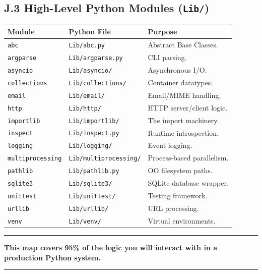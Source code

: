 \hypertarget{j.3-high-level-python-modules-lib}{%
\subsection{\texorpdfstring{J.3 High-Level Python Modules
(\texttt{Lib/})}{J.3 High-Level Python Modules (Lib/)}}\label{j.3-high-level-python-modules-lib}}

\begin{longtable}[]{@{}lll@{}}
\toprule
Module & Python File & Purpose \\
\midrule
\endhead
\passthrough{\lstinline!abc!} & \passthrough{\lstinline!Lib/abc.py!} &
Abstract Base Classes. \\
\passthrough{\lstinline!argparse!} &
\passthrough{\lstinline!Lib/argparse.py!} & CLI parsing. \\
\passthrough{\lstinline!asyncio!} &
\passthrough{\lstinline!Lib/asyncio/!} & Asynchronous I/O. \\
\passthrough{\lstinline!collections!} &
\passthrough{\lstinline!Lib/collections/!} & Container datatypes. \\
\passthrough{\lstinline!email!} & \passthrough{\lstinline!Lib/email/!} &
Email/MIME handling. \\
\passthrough{\lstinline!http!} & \passthrough{\lstinline!Lib/http/!} &
HTTP server/client logic. \\
\passthrough{\lstinline!importlib!} &
\passthrough{\lstinline!Lib/importlib/!} & The import machinery. \\
\passthrough{\lstinline!inspect!} &
\passthrough{\lstinline!Lib/inspect.py!} & Runtime introspection. \\
\passthrough{\lstinline!logging!} &
\passthrough{\lstinline!Lib/logging/!} & Event logging. \\
\passthrough{\lstinline!multiprocessing!} &
\passthrough{\lstinline!Lib/multiprocessing/!} & Process-based
parallelism. \\
\passthrough{\lstinline!pathlib!} &
\passthrough{\lstinline!Lib/pathlib.py!} & OO filesystem paths. \\
\passthrough{\lstinline!sqlite3!} &
\passthrough{\lstinline!Lib/sqlite3/!} & SQLite database wrapper. \\
\passthrough{\lstinline!unittest!} &
\passthrough{\lstinline!Lib/unittest/!} & Testing framework. \\
\passthrough{\lstinline!urllib!} & \passthrough{\lstinline!Lib/urllib/!}
& URL processing. \\
\passthrough{\lstinline!venv!} & \passthrough{\lstinline!Lib/venv/!} &
Virtual environments. \\
\bottomrule
\end{longtable}

\begin{center}\rule{0.5\linewidth}{0.5pt}\end{center}

\textbf{This map covers 95\% of the logic you will interact with in a
production Python system.}

\begin{center}\rule{0.5\linewidth}{0.5pt}\end{center}
